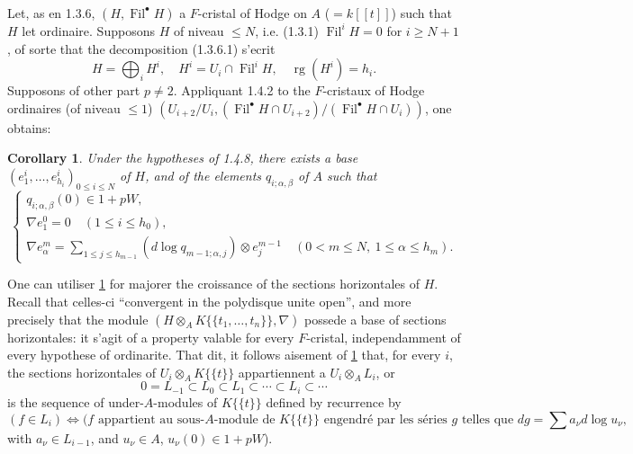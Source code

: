 \documentclass[12pt,a4paper]{article}
\theoremstyle{plain}
\newtheorem{corollary}[theorem]{Corollary}
\theoremstyle{definition}
\theoremstyle{remark}
\DeclareMathOperator{\Fil}{Fil}
\DeclareMathOperator{\rg}{rg}
\begin{document}
\subsubsection{}
Let, as en 1.3.6, $(H, \Fil^\bullet H)$ a $F$-cristal of Hodge on $A$ ($= k[[t]]$) such that $H$ let ordinaire. Supposons $H$ of niveau $\leqslant N$, i.e. (1.3.1) $\Fil^i H = 0$ for $i \geqslant N+1$, of sorte that the decomposition (1.3.6.1) s'ecrit
\begin{equation}\tag{1.4.8.1}
H = \bigoplus_i H^i, \quad H^i = U_i \cap \Fil^i H, \quad \rg(H^i) = h_i. 
\end{equation}
Supposons of other part $p \neq 2$. Appliquant 1.4.2 to the $F$-cristaux of Hodge ordinaires (of niveau $\leqslant 1$) $(U_{i+2}/U_i, (\Fil^\bullet H \cap U_{i+2})/(\Fil^\bullet H \cap U_i))$, one obtains:

\begin{corollary}\label{cor:1.4.9}
Under the hypotheses of 1.4.8, there exists a base $(e^i_1, \ldots, e^i_{h_i})_{0 \leqslant i \leqslant N}$ of $H$, and of the elements $q_{i;\alpha,\beta}$ of $A$ such that
\begin{equation}\tag{1.4.9.1}
\begin{cases}
q_{i;\alpha,\beta}(0) \in 1 + pW, \\[1ex]
\nabla e^0_1 = 0 \quad (1 \leqslant i \leqslant h_0), \\[1ex]
\displaystyle\nabla e^m_\alpha = \sum_{1 \leqslant j \leqslant h_{m-1}} (d\log q_{m-1;\alpha,j}) \otimes e^{m-1}_j \quad (0 < m \leqslant N, \ 1 \leqslant \alpha \leqslant h_m).
\end{cases} 
\end{equation}
\end{corollary}

One can utiliser \ref{cor:1.4.9} for majorer the croissance of the sections horizontales of $H$. Recall \cite[3.1]{Katz1973} that celles-ci ``convergent in the polydisque unite open'', and more precisely that the module $(H \otimes_A K\{\{t_1, \ldots, t_n\}\}, \nabla)$ possede a base of sections horizontales: it s'agit of a property valable for every $F$-cristal, independamment of every hypothese of ordinarite. That dit, it follows aisement of \ref{cor:1.4.9} that, for every $i$, the sections horizontales of $U_i \otimes_A K\{\{t\}\}$ appartiennent a $U_i \otimes_A L_i$, or
\[
0 = L_{-1} \subset L_0 \subset L_1 \subset \cdots \subset L_i \subset \cdots
\]
is the sequence of under-$A$-modules of $K\{\{t\}\}$ defined by recurrence by
\[
(f \in L_i) \Longleftrightarrow (f \text{ appartient au sous-$A$-module de } K\{\{t\}\} \text{ engendr\'e par les s\'eries } g \text{ telles que } dg = \sum a_\nu d\log u_\nu,
\]
with $a_\nu \in L_{i-1}$, and $u_\nu \in A$, $u_\nu(0) \in 1 + pW$).
\end{document}
